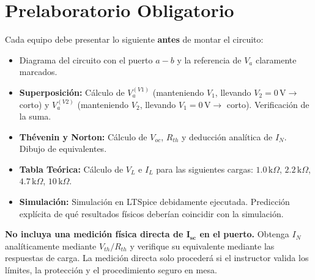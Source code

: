 \documentclass[11pt, a4paper]{article}
\begin{document}
\section{Prelaboratorio Obligatorio}
Cada equipo debe presentar lo siguiente \textbf{antes} de montar el circuito:
\begin{itemize}\setlength\itemsep{-0.1em}
    \item Diagrama del circuito con el puerto $a-b$ y la referencia de $V_a$ claramente marcados.
    \item \textbf{Superposición:} Cálculo de $V_a^{(V1)}$ (manteniendo $V_1$, llevando $V_2=0\,\text{V} \rightarrow$ corto) y $V_a^{(V2)}$ (manteniendo $V_2$, llevando $V_1=0\,\text{V} \rightarrow$ corto). Verificación de la suma.
    \item \textbf{Thévenin y Norton:} Cálculo de $V_{oc}$, $R_{th}$ y deducción analítica de $I_N$. Dibujo de equivalentes.
    \item \textbf{Tabla Teórica:} Cálculo de $V_L$ e $I_L$ para las siguientes cargas: $1.0\,\text{k}\Omega$, $2.2\,\text{k}\Omega$, $4.7\,\text{k}\Omega$, $10\,\text{k}\Omega$.
    \item \textbf{Simulación:} Simulación en LTSpice debidamente ejecutada. Predicción explícita de qué resultados físicos deberían coincidir con la simulación.
\end{itemize}

\begin{tcolorbox}[colback=red!5!white, colframe=red!80!black, title=Restricción de Seguridad: Corriente de Cortocircuito]
    \textbf{No incluya una medición física directa de $\bm{I_{sc}}$ en el puerto.} Obtenga $I_N$ analíticamente mediante $V_{th}/R_{th}$ y verifique su equivalente mediante las respuestas de carga. La medición directa solo procederá si el instructor valida los límites, la protección y el procedimiento seguro en mesa.
\end{tcolorbox}
\end{document}
